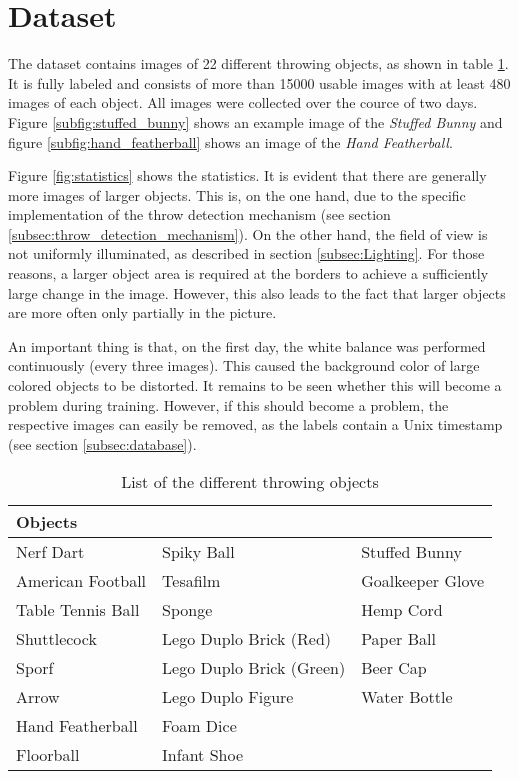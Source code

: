 \section{Dataset}
\label{sec:dataset}

The dataset contains images of 22 different throwing objects, as shown in table \ref{tab:objects}.
It is fully labeled and consists of more than \num{15000} usable images with at least 480 images of each object.
All images were collected over the cource of two days.
Figure \ref{subfig:stuffed_bunny} shows an example image of the \textit{Stuffed Bunny} and figure \ref{subfig:hand_featherball} shows an image of the \textit{Hand Featherball}.

Figure \ref{fig:statistics} shows the statistics.
It is evident that there are generally more images of larger objects.
This is, on the one hand, due to the specific implementation of the throw detection mechanism (see section \ref{subsec:throw_detection_mechanism}).
On the other hand, the field of view is not uniformly illuminated, as described in section \ref{subsec:Lighting}.
For those reasons, a larger object area is required at the borders to achieve a sufficiently large change in the image.
However, this also leads to the fact that larger objects are more often only partially in the picture.

An important thing is that, on the first day, the white balance was performed continuously (every three images).
This caused the background color of large colored objects to be distorted.
It remains to be seen whether this will become a problem during training.
However, if this should become a problem, the respective images can easily be removed, as the labels contain a Unix timestamp (see section \ref{subsec:database}).

\begin{table}[hb]
  \caption{List of the different throwing objects}
  \label{tab:objects}
  \centering
  \begin{tabular}{lll}
    \toprule
    \textbf{Objects} &  &  \\
    \midrule
	Nerf Dart & Spiky Ball & Stuffed Bunny \\
	American Football & Tesafilm & Goalkeeper Glove \\
	Table Tennis Ball & Sponge & Hemp Cord \\
	Shuttlecock & Lego Duplo Brick (Red) & Paper Ball \\
	Sporf & Lego Duplo Brick (Green) & Beer Cap \\
	Arrow & Lego Duplo Figure & Water Bottle \\
	Hand Featherball & Foam Dice &  \\
	Floorball & Infant Shoe &  \\
    \bottomrule
  \end{tabular}
\end{table}

